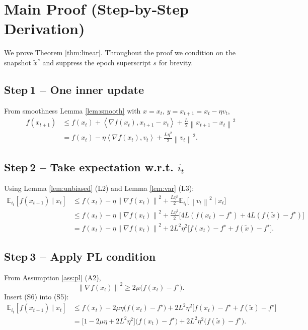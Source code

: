 \documentclass{article}
\newcommand{\E}{\mathbb{E}}
\newcommand{\norm}[1]{\left\|#1\right\|}
\newcommand{\inner}[2]{\left\langle #1,#2\right\rangle}
\begin{document}
\section*{Main Proof (Step‑by‑Step Derivation)}
We prove Theorem \ref{thm:linear}.  Throughout the proof we condition on the
snapshot $\tilde{x}^{s}$ and suppress the epoch superscript $s$ for brevity.

\subsection*{Step 1 – One inner update}
From smoothness Lemma \ref{lem:smooth} with $x=x_t$, $y=x_{t+1}=x_t-\eta v_t$,
\[
\begin{aligned}
f(x_{t+1})
&\le f(x_t)+\inner{\nabla f(x_t)}{x_{t+1}-x_t}
       +\frac{L}{2}\norm{x_{t+1}-x_t}^{2}                         \tag{S1}\\
&= f(x_t)-\eta\inner{\nabla f(x_t)}{v_t}
   +\frac{L\eta^{2}}{2}\norm{v_t}^{2}.                           \tag{S2}
\end{aligned}
\]

\subsection*{Step 2 – Take expectation w.r.t. $i_t$}
Using Lemma \ref{lem:unbiased} (L2) and Lemma \ref{lem:var} (L3):
\[
\begin{aligned}
\E_{i_t}[f(x_{t+1})\mid x_t]
&\le f(x_t)-\eta\norm{\nabla f(x_t)}^{2}
   +\frac{L\eta^{2}}{2}\E_{i_t}\!\bigl[\norm{v_t}^{2}\mid x_t\bigr] \tag{S3}\\
&\le f(x_t)-\eta\norm{\nabla f(x_t)}^{2}
   +\frac{L\eta^{2}}{2}\bigl[4L(f(x_t)-f^{\star})
                         +4L(f(\tilde{x})-f^{\star})\bigr]      \tag{S4}\\
&= f(x_t)-\eta\norm{\nabla f(x_t)}^{2}
   +2L^{2}\eta^{2}\bigl[f(x_t)-f^{\star}+f(\tilde{x})-f^{\star}\bigr].\tag{S5}
\end{aligned}
\]

\subsection*{Step 3 – Apply PL condition}
From Assumption \ref{ass:pl} (A2),
\[
\norm{\nabla f(x_t)}^{2}\ge 2\mu\bigl(f(x_t)-f^{\star}\bigr). \tag{S6}
\]
Insert (S6) into (S5):
\[
\begin{aligned}
\E_{i_t}[f(x_{t+1})\mid x_t]
&\le f(x_t)-2\mu\eta\bigl(f(x_t)-f^{\star}\bigr)
   +2L^{2}\eta^{2}\bigl[f(x_t)-f^{\star}+f(\tilde{x})-f^{\star}\bigr] \tag{S7}\\
&= \bigl[1-2\mu\eta+2L^{2}\eta^{2}\bigr]\bigl(f(x_t)-f^{\star}\bigr)
   +2L^{2}\eta^{2}\bigl(f(\tilde{x})-f^{\star}\bigr).                         \tag{S8}
\end{aligned}
\]
\end{document}
